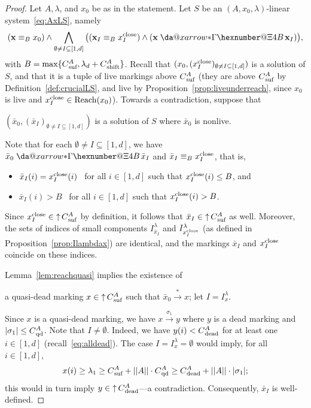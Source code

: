 \documentclass[11pt,a4paper]{amsart}
\makeatletter
\DeclareMathOperator{\Reach}{Reach}
\newcommand{\step}[1]{\mathrel{\xrightarrow{#1}}}
\newcommand{\reach}{\step{*}}
\newcommand{\virtual}[1]{\mathrel{\xdashrightarrow{#1}}\hspace{-0.3em}}
\newcommand{\vreach}{\virtual{*}}
\newcommand{\bvar}[1]{\mathbf{#1}}
\newcommand{\nnorm}[1]{||#1||}
\newcommand{\upC}[1]{\mathop{\uparrow}#1}
\newcommand{\dead}{{}_\textnormal{dead}}
\newcommand{\suf}{{}_\textnormal{suf}}
\newcommand{\shift}{{}_\textnormal{shift}}
\newcommand{\close}{\textnormal{close}}
\newcommand{\qd}{{}_\textnormal{qd}}
\newcommand*{\da@rightarrow}{\mathchar"0\hexnumber@\symAMSa 4B }
\newcommand*{\xdashrightarrow}[2][]{%
  \mathrel{%
    \mathpalette{\da@xarrow{#1}{#2}{}\da@rightarrow{\,}{}}{}%
  }%
}
\newcommand*{\da@xarrow}[7]{%
  \sbox0{$\ifx#7\scriptstyle\scriptscriptstyle\else\scriptstyle\fi#5#1#6\m@th$}%
  \sbox2{$\ifx#7\scriptstyle\scriptscriptstyle\else\scriptstyle\fi#5#2#6\m@th$}%
  \sbox4{$#7\dabar@\m@th$}%
  \dimen@=\wd0 %
  \ifdim\wd2 >\dimen@
    \dimen@=\wd2 %
  \fi
  \count@=2 %
  \def\da@bars{\dabar@\dabar@}%
  \@whiledim\count@\wd4<\dimen@\do{%
    \advance\count@\@ne
    \expandafter\def\expandafter\da@bars\expandafter{%
      \da@bars
      \dabar@ 
    }%
  }%
  \mathrel{#3}%
  \mathrel{%
    \mathop{\da@bars}\limits
    \ifx\\#1\\%
    \else
      _{\copy0}%
    \fi
    \ifx\\#2\\%
    \else
      ^{\copy2}%
    \fi
  }%
  \mathrel{#4}%
}
\theoremstyle{plain}
\theoremstyle{definition}
\theoremstyle{defC}
\theoremstyle{thmC}
\makeatother
\begin{document}
\begin{proof}
	Let $A,\lambda$, and $x_0$ be as in the statement.
	Let $S$ be an $(A,x_0,\lambda)$-linear
	system~\eqref{eq:AxLS}, namely
\begin{equation*}
	(\bvar{x}\equiv_B x_0)
	\land
	\bigwedge_{\emptyset\neq I\subseteq[1,d]}\big((\bvar{x}_I\equiv_B x^\close_I)\land
	(\bvar{x}\virtual{*}\bvar{x}_I)\big),
\end{equation*}
with $B=\max\{C\suf^A,\lambda_d+C\shift^A\}$.
Recall that $({x}_0,({x}_I^\close)_{\emptyset\neq I\subseteq[1,d]})$ is a
solution of $S$, and that it is a tuple of live markings above
$C\suf^A$ (they are above $C\suf^A$ by
Definition~\ref{def:crucialLS}, and live by
Proposition~\ref{prop:liveunderreach}, since $x_0$ is live and
${x}_I^\close\in\Reach(x_0)$).
Towards a contradiction, suppose that
	\begin{center}
$(\bar{x}_0,(\bar{x}_I)_{\emptyset\neq I\subseteq[1,d]})$ is a solution of $S$
where $\bar{x}_0$ is nonlive. 
	\end{center}
	Note that for each $\emptyset\neq I\subseteq[1,d]$, we have
	$\bar{x}_0\vreach \bar{x}_I$ and
	$\bar{x}_I\equiv_B
	x^\close_I$, that is, 
	\begin{itemize}
		\item			
			$\bar{x}_I(i)=x^\close_I(i)$ \ for all
			$i\in[1,d]$ such that $x^\close_I(i)\leq B$, and
\item
			$\bar{x}_I(i)>B$ \ for all
			$i\in[1,d]$ such that $x^\close_I(i)>B$.
	\end{itemize}			
Since $x^\close_I\in\upC{C\suf^A}$ by definition, it follows that 
	$\bar{x}_I\in\upC{C\suf^A}$ as well.
	Moreover, the sets of indices of small components 
	$I^\lambda_{\bar{x}_I}$ and $I^\lambda_{x^\close_I}$
	(as defined in	Proposition~\ref{prop:Ilambdax}) are
	identical,
	and the markings $\bar{x}_I$ and $x^\close_I$ coincide on
	these indices.

\smallskip

	Lemma~\ref{lem:reachquasi} implies the existence of
	\begin{center}
	a quasi-dead
		marking $x\in\upC{C\suf^A}$ 
		such that 
	$\bar{x}_0\reach x$; let
 $I=I^\lambda_{x}$. 
	\end{center}		
Since $x$ is a quasi-dead marking, we have $x\step{\sigma_1}y$ where
$y$ is a dead marking and
	$|\sigma_1|\leq C\qd^A$.  
	Note that $I\neq\emptyset$. Indeed, we have $y(i)< C\dead^A$
	for at least one $i\in[1,d]$ (recall~\eqref{eq:alldead}).
The case $I=I^\lambda_{x}=\emptyset$ would imply,	 for all
	$i\in[1,d]$,
	\[x(i)\geq
	\lambda_1\geq C\suf^A+\nnorm{A}\cdot
	C\qd^A\geq 
	C\dead^A+\nnorm{A}\cdot |\sigma_1|;\]
this would in turn imply $y\in\upC{C\dead^A}$---a contradiction.  
Consequently, $\bar{x}_{I}$ is well-defined.


\end{proof}
\end{document}
